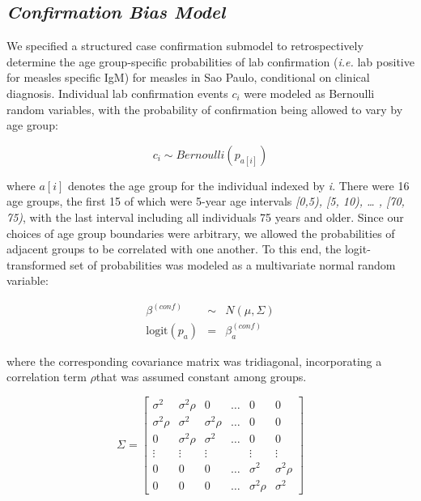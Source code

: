 \subsection{\texorpdfstring{\emph{Confirmation Bias
Model}}{Confirmation Bias Model}}\label{confirmation-bias-model}

We specified a structured case confirmation submodel to retrospectively
determine the age group-specific probabilities of lab confirmation (\emph{i.e.}
lab positive for measles specific IgM) for measles in Sao Paulo,
conditional on clinical diagnosis. Individual lab confirmation events
\(c_i\) were modeled as Bernoulli random variables,
with the probability of confirmation being allowed to vary by age group:

\[c_{i} \sim Bernoulli(p_{a[i]})\]

where \(a[i]\) denotes the age group for the individual
indexed by \emph{i}. There were 16 age groups, the first 15 of which
were 5-year age intervals \emph{{[}0,5), {[}5, 10), \ldots{} , {[}70,
75)}, with the last interval including all individuals 75 years and
older. Since our choices of age group boundaries were arbitrary, we
allowed the probabilities of adjacent groups to be correlated with one
another. To this end, the logit-transformed set of probabilities was
modeled as a multivariate normal random variable: 

\begin{eqnarray}
\beta^{(conf)} &\sim& N(\mu, \Sigma) \\
\text{logit}(p_a) &=& \beta_a^{(conf)}
\end{eqnarray}

where the corresponding covariance matrix was tridiagonal, incorporating a
correlation term \(\rho\)that was assumed constant among groups.

\[
\Sigma = \left[{
\begin{array}{cccccc}
  {\sigma^2} & {\sigma^2 \rho} & 0& \ldots & {0} & {0}  \\
  {\sigma^2 \rho} & {\sigma^2} &  \sigma^2 \rho & \ldots & {0}  & {0} \\
  {0} & \sigma^2 \rho & {\sigma^2} & \ldots & {0} & {0} \\
  \vdots & \vdots & \vdots &  & \vdots & \vdots\\
  {0} & {0} & 0 & \ldots &  {\sigma^2} & \sigma^2 \rho  \\
{0} & {0} & 0 & \ldots & \sigma^2 \rho &  {\sigma^2} 
\end{array}
}\right]\]


